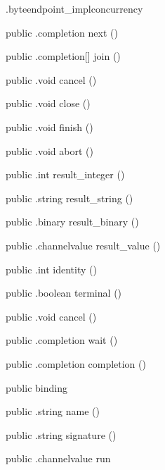 \begin{CrexxClass}{.byteendpoint\_impl}{concurrency}
\begin{Members}
    \Method
      {public}
      {.completion}
      {next}
      {()}

    \Method
      {public}
      {.completion[]}
      {join}
      {()}

    \Method
      {public}
      {.void}
      {cancel}
      {()}

    \Method
      {public}
      {.void}
      {close}
      {()}

    \Method
      {public}
      {.void}
      {finish}
      {()}

    \Method
      {public}
      {.void}
      {abort}
      {()}

    \Method
      {public}
      {.int}
      {result\_integer}
      {()}

    \Method
      {public}
      {.string}
      {result\_string}
      {()}

    \Method
      {public}
      {.binary}
      {result\_binary}
      {()}

    \Method
      {public}
      {.channelvalue}
      {result\_value}
      {()}

    \Method
      {public}
      {.int}
      {identity}
      {()}

    \Method
      {public}
      {.boolean}
      {terminal}
      {()}

    \Method
      {public}
      {.void}
      {cancel}
      {()}

    \Method
      {public}
      {.completion}
      {wait}
      {()}

    \Method
      {public}
      {.completion}
      {completion}
      {()}

    \Factory
      {public}
      {binding}
      {}

    \Method
      {public}
      {.string}
      {name}
      {()}

    \Method
      {public}
      {.string}
      {signature}
      {()}

    \Method
      {public}
      {.channelvalue}
      {run}
      {}


\end{Members}
\end{CrexxClass}
